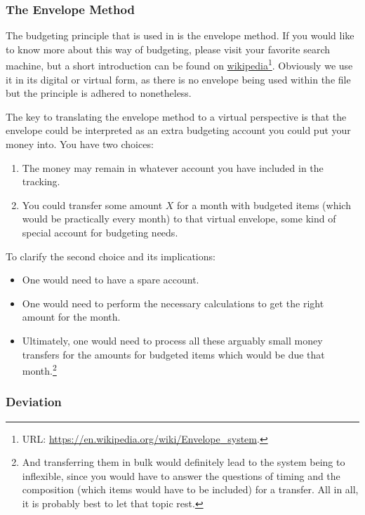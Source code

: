\subsubsection{The Envelope Method}
\label{subsubsec:budgeting-the-envelope-method}

The budgeting principle that is used in \tfn is the envelope method.
If you would like to know more about this way of budgeting, please visit your favorite search machine, but a short introduction can be found on \href{https://en.wikipedia.org/wiki/Envelope_system}{wikipedia}\footnote{URL: \href{https://en.wikipedia.org/wiki/Envelope_system}{https://en.wikipedia.org/wiki/Envelope{\_}system}.}.
Obviously we use it in its digital or virtual form, as there is no envelope being used within the file but the principle is adhered to nonetheless.

The key to translating the envelope method to a virtual perspective is that the envelope could be interpreted as an extra budgeting account you could put your money into.
You have two choices:
\begin{enumerate}
	\item The money may remain in whatever account you have included in the tracking.
	\item You could transfer some amount \( X \) for a month with budgeted items (which would be practically every month) to that virtual envelope, \ie some kind of special account for budgeting needs.
\end{enumerate}

To clarify the second choice and its implications:
\begin{itemize}
	\item One would need to have a spare account.
	\item One would need to perform the necessary calculations to get the right amount for the month.
	\item Ultimately, one would need to process all these arguably small money transfers for the amounts for budgeted items which would be due that month.\footnote{And transferring them in bulk would definitely lead to the system being to inflexible, since you would have to answer the questions of timing and the composition (which items would have to be included) for a transfer.
	All in all, it is probably best to let that topic rest.}
\end{itemize}

\subsubsection{Deviation}
\label{subsubsec:budeting-deviation}

